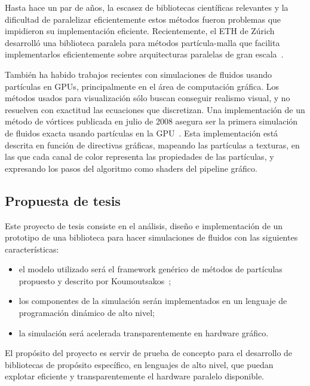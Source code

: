 \documentclass[11pt,spanish]{article}
\newcommand{\vel}{\mathbf{u}}
\newcommand{\vort}{\mathbf{\omega}}
\begin{document}
Hasta hace un par de años, la escasez de bibliotecas científicas relevantes y la
dificultad de paralelizar eficientemente estos métodos fueron problemas que
impidieron su implementación eficiente.  Recientemente, el ETH de Zúrich desarrolló una
biblioteca paralela para métodos partícula-malla que facilita implementarlos
eficientemente sobre arquitecturas paralelas de gran escala~\cite{ppm}.

También ha habido trabajos recientes con simulaciones de fluidos usando partículas
en GPUs, principalmente en el área de computación gráfica.  Los métodos usados
para visualización sólo buscan conseguir realismo visual, y no resuelven con
exactitud las ecuaciones que discretizan.  Una implementación de un método de
vórtices publicada en julio de 2008 asegura ser la primera simulación de fluidos
exacta usando partículas en la GPU~\cite{vortex-gpu}.  Esta implementación está
descrita en función de directivas gráficas, mapeando las partículas a texturas,
en las que cada canal de color representa las propiedades de las partículas, y
expresando los pasos del algoritmo como shaders del pipeline gráfico.



\subsection{Propuesta de tesis}
Este proyecto de tesis consiste en el análisis, diseño e implementación de un
prototipo de una biblioteca para hacer simulaciones de fluidos con las
siguientes características:
\begin{itemize}
    \item el modelo utilizado será el framework genérico de métodos de
       partículas propuesto y descrito por Koumoutsakos~\cite{multiscale};
    \item los componentes de la simulación serán implementados en un lenguaje de
        programación dinámico de alto nivel;
    \item la simulación será acelerada transparentemente en hardware gráfico.
\end{itemize}
El propósito del proyecto es servir de prueba de concepto para el
desarrollo de bibliotecas de propósito específico, en lenguajes de alto nivel,
que puedan explotar eficiente y transparentemente el hardware paralelo disponible.
\end{document}

